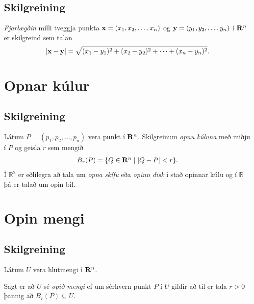 \documentclass[a4paper,10pt,icelandic]{sphinxmanual}
\begin{document}
\subsection{Skilgreining}
\label{Kafli2:index-2}\label{Kafli2:id2}
\emph{Fjarlægðin} milli tveggja punkta
\(\mbox{${\bf x}$}=(x_1,x_2, \ldots,x_n)\) og
\(\mbox{${\bf y}$}=(y_1,y_2, \ldots,y_n)\) í
\(\mbox{${\bf R}^n$}\) er skilgreind sem talan
\begin{gather}
\begin{split}\displaystyle |\mbox{${\bf x}$}-\mbox{${\bf y}$}|=\sqrt{(x_1-y_1)^2+(x_2-y_2)^2+\cdots+(x_n-y_n)^2}.\end{split}\notag
\end{gather}

\section{Opnar kúlur}
\label{Kafli2:opnar-kulur}

\subsection{Skilgreining}
\label{Kafli2:index-3}\label{Kafli2:id3}
Látum \(P=(p_1,p_2,\ldots,p_n)\) vera punkt í
\(\mbox{${\bf R}^n$}\). Skilgreinum \emph{opnu kúluna} með miðju í
\(P\) og geisla \(r\) sem mengið
\begin{gather}
\begin{split}\displaystyle B_r(P)=\{Q\in\mbox{${\bf R}^n$}\mid |Q-P|<r\}.\end{split}\notag
\end{gather}
Í \({\mathbb  R}^2\) er eðlilegra að tala um \emph{opna skífu} eða \emph{opinn
disk} í stað opinnar kúlu og í \({\mathbb  R}\) þá er talað um opin
bil.


\section{Opin mengi}
\label{Kafli2:opin-mengi}

\subsection{Skilgreining}
\label{Kafli2:index-4}\label{Kafli2:id4}
Látum \(U\) vera hlutmengi í \(\mbox{${\bf R}^n$}\).

Sagt er að \(U\) sé \emph{opið mengi} ef um sérhvern punkt \(P\) í
\(U\) gildir að til er tala \(r>0\) þannig að
\(B_r(P)\subseteq U\).
\end{document}
